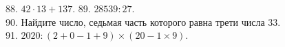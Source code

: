 88. $42\cdot13+137.$ 89. $28539:27.$\\ 90. Найдите число, седьмая часть которого равна трети числа 33. \\  91. $2020:(2+0-1+9) \times (20-1 \times 9).$\qquad
